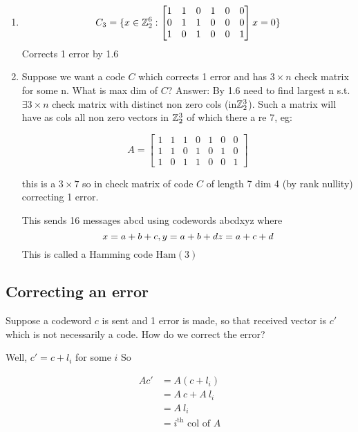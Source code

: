 \documentclass[]{article}
\theoremstyle{definition}
\theoremstyle{remark}
\numberwithin{equation}{section}
\begin{document}
		\begin{enumerate}
		\item
		\[C_3 = \{
			x \in \mathbb{Z}_2^6 : \begin{bmatrix}
			1 & 1 & 0 & 1 & 0 & 0 \\
			0 & 1 & 1 & 0 & 0 & 0 \\
			1 & 0 & 1 & 0 & 0 & 1
			\end{bmatrix}x = 0
		\}\]
		Corrects 1 error by 1.6

		\item Suppose we want a code $C$ which corrects 1 error and has $3 \times n$ check matrix for some n. What is max dim of $C$?
		Answer:
		By 1.6 need to find largest n s.t. $\exists 3 \times n $ check matrix with distinct non zero cols (in$\mathbb{Z}_2^3$). Such a matrix will have as cols all non zero vectors in $\mathbb{Z}_2^3$ of which there a re 7, eg:

		\[
		A = \begin{bmatrix}
			1 & 1 & 1 & 0 & 1 & 0 & 0 \\
			1 & 1 & 0 & 1 & 0 & 1 & 0 \\
			1 & 0 & 1 & 1 & 0 & 0 & 1
			\end{bmatrix}
		\]

		this is a $3\times 7$ so in check matrix of code $C$ of length 7 dim 4 (by rank nullity) correcting 1 error.

		This sends 16 messages abcd using codewords abcdxyz where
		\[
			x = a + b + c,\\
			y = a +b + d \\
			z = a + c + d
		\]
		This is called a Hamming code $\text{Ham}(3)$

		\end{enumerate}
	\subsection{Correcting an error}
		Suppose a codeword $c$ is sent and 1 error is made, so that received vector is $c'$ which is not necessarily a code. How do we correct the error?

		Well, $c' = c + l_i$ for some $i$
		So

		\begin{align*}
			Ac' &= A(c+l_i) \\
				&= A\ c + A\ l_i \\
				&= A\ l_i \\
				&= \text{$i^\text{th}$ col of $A$}
		\end{align*}
\end{document}
